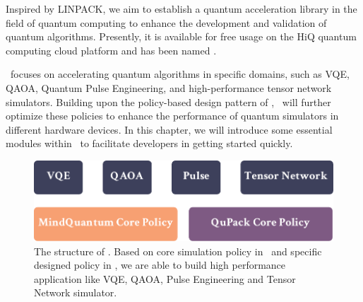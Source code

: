Inspired by LINPACK, we aim to establish a quantum acceleration library in the field of quantum computing to enhance the development and validation of quantum algorithms. Presently, it is available for free usage on the HiQ quantum computing cloud platform and has been named \QuPack.

\QuPack\ focuses on accelerating quantum algorithms in specific domains, such as VQE, QAOA, Quantum Pulse Engineering, and high-performance tensor network simulators. Building upon the policy-based design pattern of \MindQuantum, \QuPack\ will further optimize these policies to enhance the performance of quantum simulators in different hardware devices. In this chapter, we will introduce some essential modules within \QuPack\ to facilitate developers in getting started quickly.

\begin{figure}[ht]
    \centering
    \includegraphics[scale=0.5]{./images/6_qupack_layer.pdf}
    \captionsetup{justification=raggedright,singlelinecheck=false}
    \caption{\label{6_qupack_layer} The structure of \QuPack. Based on core simulation policy in \MindQuantum\ and specific designed policy in \QuPack, we are able to build high performance application like VQE, QAOA, Pulse Engineering and Tensor Network simulator.}
\end{figure}
